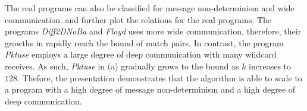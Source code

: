 The real programs can also be classified for message non-determinism and wide communication.  and  further plot the relations for the real programs. 
The programs \textit{Diff2DNoBa} and \textit{Floyd} uses more wide communication, therefore, their growths in  rapidly reach the bound of match pairs. In contrast, the program \textit{Pktuse} employs a large degree of deep communication with many wildcard receives. As such, \textit{Pktuse} in  (a) gradually grows to the bound as $k$ increases to $128$.
Thefore, the presentation demonstrates that the algorithm is able to scale to a program with a high degree of message non-determinism and a high degree of deep communication.


